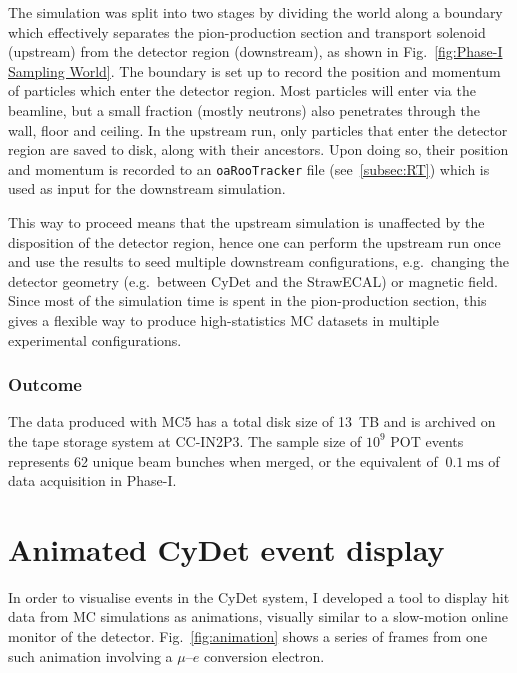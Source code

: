 The simulation was split into two stages by dividing the world along a boundary which effectively separates the pion-production section and transport solenoid (upstream) from the detector region (downstream), as shown in Fig.~\ref{fig:Phase-I Sampling World}. The boundary is set up to record the position and momentum of particles which enter the detector region. Most particles will enter via the beamline, but a small fraction (mostly neutrons) also penetrates through the wall, floor and ceiling. 
In the upstream run, only particles that enter the detector region are saved to disk, along with their ancestors. Upon doing so, their position and momentum is recorded to an \texttt{oaRooTracker} file (see~\ref{subsec:RT}) which is used as input for the downstream simulation.

This way to proceed means that the upstream simulation is unaffected by the disposition of the detector region, hence one can perform the upstream run once and use the results to seed multiple downstream configurations, e.g.\ changing the detector geometry (e.g.\ between CyDet and the StrawECAL) or magnetic field. Since most of the simulation time is spent in the pion-production section, this gives a flexible way to produce high-statistics MC datasets in multiple experimental configurations.

\subsubsection{Outcome}
The data produced with MC5 has a total disk size of \SI{13}{TB} and is archived on the tape storage system at CC-IN2P3. The sample size of $10^9$ POT events represents 62 unique beam bunches when merged, or the equivalent of $~\SI{0.1}{\ms}$ of data acquisition in Phase-I.

\section{Animated CyDet event display}
In order to visualise events in the CyDet system, I developed a tool to display hit data from MC simulations as animations, visually similar to a slow-motion online monitor of the detector. Fig.~\ref{fig:animation} shows a series of frames from one such animation involving a $\mu$--$e$ conversion electron.

